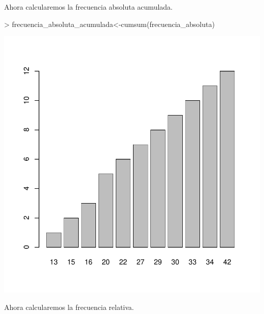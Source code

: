 \documentclass [a4paper] {article}
\begin{document}
Ahora calcularemos la frecuencia absoluta acumulada.

\begin{Schunk}
\begin{Sinput}
> frecuencia_absoluta_acumulada<-cumsum(frecuencia_absoluta)
\end{Sinput}
\end{Schunk}
\begin{center}
\includegraphics{entrega-frecuencia_absoluta_acumulada_satelites_plot}
\end{center}

Ahora calcularemos la frecuencia relativa.
\end{document}
